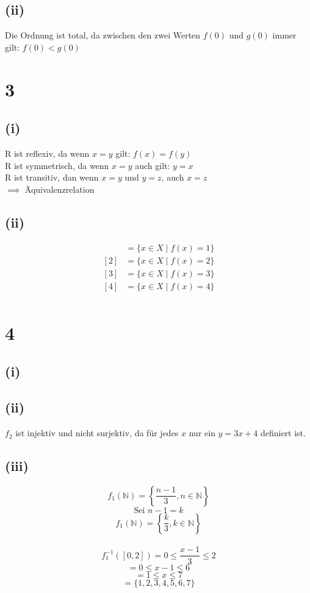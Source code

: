 \documentclass{article}
\begin{document}
\subsection{(ii)}
Die Ordnung ist total, da zwischen den zwei Werten $f(0)$ und $g(0)$ immer gilt: $f(0) < g(0)$

\section{3}
\subsection{(i)}
R ist reflexiv, da wenn $x = y$ gilt: $f(x) = f(y)$ \\
R ist symmetrisch, da wenn $x = y$ auch gilt: $y = x$ \\
R ist transitiv, dan wenn $x = y$ und $y = z$, auch $x = z$ \\
$\implies$ Äquivalenzrelation
\subsection{(ii)}
\begin{align*}
    [1] &= \{ x \in X \mid f(x) = 1 \} \\
    [2] &= \{ x \in X \mid f(x) = 2 \} \\ 
    [3] &= \{ x \in X \mid f(x) = 3 \} \\ 
    [4] &= \{ x \in X \mid f(x) = 4 \} \\
\end{align*}

\section{4}
\subsection{(i)}

\subsection{(ii)}
$f_2$ ist injektiv und nicht surjektiv, da für jedes $x$ nur ein $y = 3x + 4$ definiert ist.
\subsection{(iii)}
\[f_1(\mathbb{N}) = \left\{ \frac{n-1}{3}, n \in \mathbb{N} \right\}\]
\[\text{Sei } n-1 = k\]
\[f_1(\mathbb{N}) = \left\{\frac{k}{3}, k \in \mathbb{N}\right\}\]
\\ \newline
\[f_1^{-1}([0,2]) = 0 \leq \frac{x-1}{3} \leq 2\]
\[= 0 \leq x - 1 \leq 6\]
\[= 1 \leq x \leq 7\]
\[= \{1, 2, 3, 4, 5, 6, 7\}\]
\end{document}
